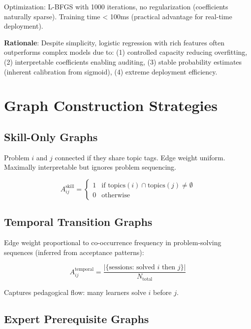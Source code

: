 \documentclass[conference]{IEEEtran}
\begin{document}
Optimization: L-BFGS with 1000 iterations, no regularization (coefficients naturally sparse). Training time < 100ms (practical advantage for real-time deployment).

\textbf{Rationale}: Despite simplicity, logistic regression with rich features often outperforms complex models due to: (1) controlled capacity reducing overfitting, (2) interpretable coefficients enabling auditing, (3) stable probability estimates (inherent calibration from sigmoid), (4) extreme deployment efficiency.

\section{Graph Construction Strategies} \label{sec:graphs}

\subsection{Skill-Only Graphs}

Problem $i$ and $j$ connected if they share topic tags. Edge weight uniform. Maximally interpretable but ignores problem sequencing.

\begin{equation}
A_{ij}^{\text{skill}} = \begin{cases} 1 & \text{if topics}(i) \cap \text{topics}(j) \neq \emptyset \\ 0 & \text{otherwise} \end{cases}
\end{equation}

\subsection{Temporal Transition Graphs}

Edge weight proportional to co-occurrence frequency in problem-solving sequences (inferred from acceptance patterns):

\begin{equation}
A_{ij}^{\text{temporal}} = \frac{|\{\text{sessions: solved } i \text{ then } j\}|}{N_{\text{total}}}
\end{equation}

Captures pedagogical flow: many learners solve $i$ before $j$.

\subsection{Expert Prerequisite Graphs}
\end{document}
